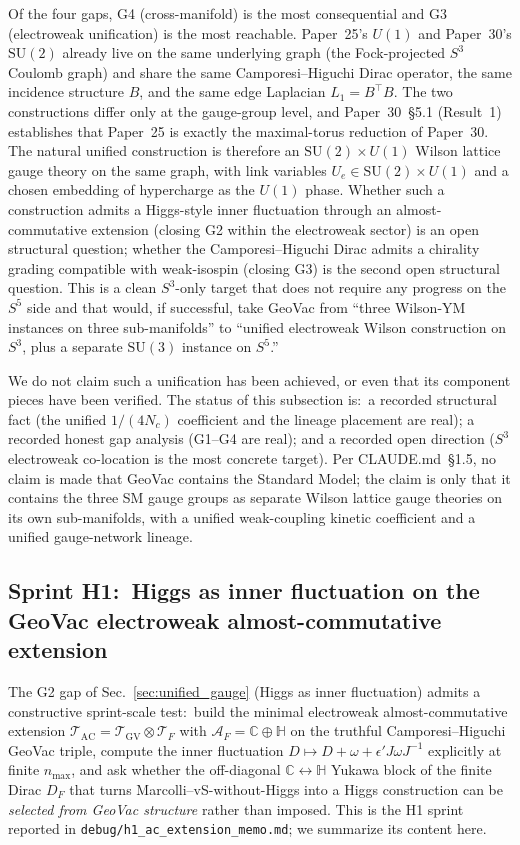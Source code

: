 \documentclass[11pt]{article}
\begin{document}
Of the four gaps, G4 (cross-manifold) is the most consequential and
G3 (electroweak unification) is the most reachable.  Paper~25's
$U(1)$ and Paper~30's $\mathrm{SU}(2)$ already live on the same
underlying graph (the Fock-projected $S^3$ Coulomb graph) and
share the same Camporesi--Higuchi Dirac operator, the same
incidence structure $B$, and the same edge Laplacian $L_1 = B^{\top}
B$.  The two constructions differ only at the gauge-group level,
and Paper~30~\S 5.1 (Result~1) establishes that Paper~25 is
exactly the maximal-torus reduction of Paper~30.  The natural
unified construction is therefore an $\mathrm{SU}(2) \times U(1)$
Wilson lattice gauge theory on the same graph, with link variables
$U_e \in \mathrm{SU}(2) \times U(1)$ and a chosen embedding of
hypercharge as the $U(1)$ phase.  Whether such a construction
admits a Higgs-style inner fluctuation through an
almost-commutative extension (closing G2 within the electroweak
sector) is an open structural question; whether the
Camporesi--Higuchi Dirac admits a chirality grading compatible with
weak-isospin (closing G3) is the second open structural question.
This is a clean $S^3$-only target that does not require any
progress on the $S^5$ side and that would, if successful, take
GeoVac from ``three Wilson-YM instances on three sub-manifolds''
to ``unified electroweak Wilson construction on $S^3$, plus a
separate $\mathrm{SU}(3)$ instance on $S^5$.''

We do not claim such a unification has been achieved, or even that
its component pieces have been verified.  The status of this
subsection is:\ a recorded structural fact (the unified $1/(4
N_c)$ coefficient and the lineage placement are real); a recorded
honest gap analysis (G1--G4 are real); and a recorded open
direction ($S^3$ electroweak co-location is the most concrete
target).  Per CLAUDE.md~\S 1.5, no claim is made that GeoVac
contains the Standard Model; the claim is only that it contains
the three SM gauge groups as separate Wilson lattice gauge
theories on its own sub-manifolds, with a unified weak-coupling
kinetic coefficient and a unified gauge-network lineage.

\subsection{Sprint H1:\ Higgs as inner fluctuation on the GeoVac
electroweak almost-commutative extension}
\label{sec:higgs_h1}

The G2 gap of Sec.~\ref{sec:unified_gauge} (Higgs as inner
fluctuation) admits a constructive sprint-scale test:\ build the
minimal electroweak almost-commutative extension
$\mathcal{T}_{\mathrm{AC}} = \mathcal{T}_{\mathrm{GV}} \otimes
\mathcal{T}_F$ with $\mathcal{A}_F = \mathbb{C} \oplus \mathbb{H}$ on
the truthful Camporesi--Higuchi GeoVac triple, compute the inner
fluctuation $D \mapsto D + \omega + \epsilon' J \omega J^{-1}$
explicitly at finite $n_{\max}$, and ask whether the off-diagonal
$\mathbb{C} \leftrightarrow \mathbb{H}$ Yukawa block of the finite
Dirac $D_F$ that turns Marcolli--vS-without-Higgs into a Higgs
construction can be \emph{selected from GeoVac structure} rather
than imposed.  This is the H1 sprint reported in
\texttt{debug/h1\_ac\_extension\_memo.md}; we summarize its content
here.
\end{document}
